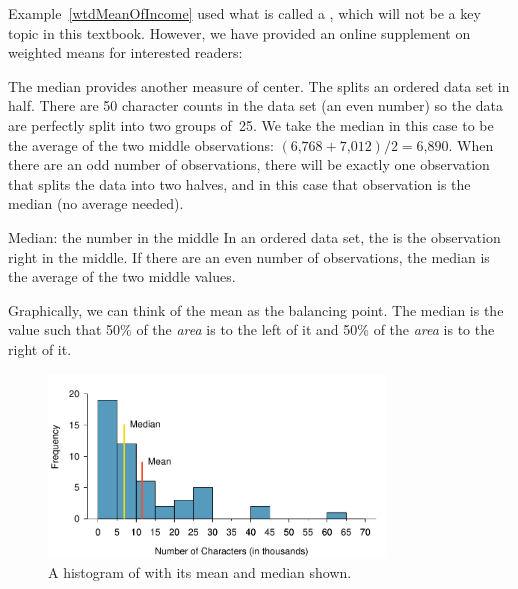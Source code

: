 Example~\ref{wtdMeanOfIncome} used what is called a , which will not be a key topic in this textbook. However, we have provided an online supplement on weighted means for interested readers:
\begin{center}
\end{center}

The median provides another measure of center. The  splits an ordered data set in half. There are 50 character counts in the  data set (an even number) so the data are perfectly split into two groups of~25. We take the median in this case to be the average of the two middle observations: $(\text{6,768} + \text{7,012}) / 2 = \text{6,890}$. When there are an odd number of observations, there will be exactly one observation that splits the data into two halves, and in this case that observation is the median (no average needed).

\begin{onebox}{Median: the number in the middle}
In an ordered data set, the  is the observation right in the middle. If there are an even number of observations, the median is the average of the two middle values.\end{onebox}

Graphically, we can think of the mean as the balancing point. The median is the value such that 50\% of the \emph{area} is to the left of it and 50\% of the \emph{area} is to the right of it.


\begin{figure}[h]
   \centering
   \includegraphics[width=0.8\textwidth]{ch_summarizing_data/figures/email50NumCharHist/email50NumCharHistWMeanMedian}
   \caption{A histogram of  with its mean and median shown.}
   \label{email50NumCharHistWMeanMedian}
\end{figure}

